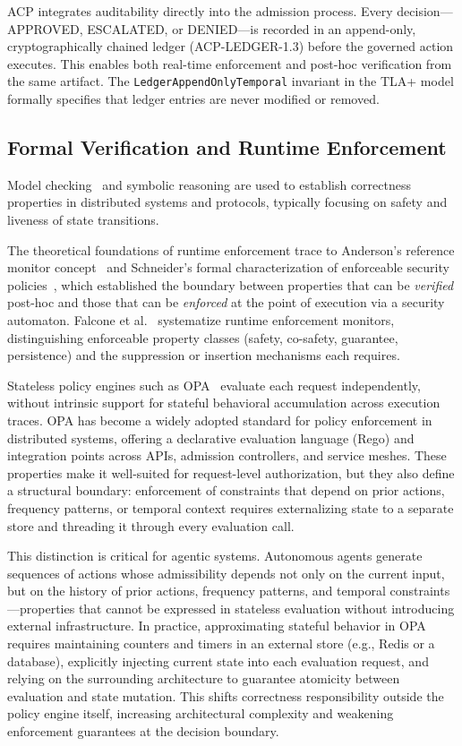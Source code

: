 \documentclass[11pt]{article}
\theoremstyle{definition}
\begin{document}
ACP integrates auditability directly into the admission process.
Every decision---APPROVED, ESCALATED, or DENIED---is recorded in an append-only, cryptographically
chained ledger (ACP-LEDGER-1.3) before the governed action executes.
This enables both real-time enforcement and post-hoc verification from the same artifact.
The \texttt{LedgerAppendOnlyTemporal} invariant in the TLA+ model formally specifies
that ledger entries are never modified or removed.

\subsection{Formal Verification and Runtime Enforcement}
\label{sec:related-formal}

Model checking~\cite{lamport2002specifying} and symbolic reasoning are used to establish
correctness properties in distributed systems and protocols, typically focusing on safety
and liveness of state transitions.

The theoretical foundations of runtime enforcement trace to Anderson's reference monitor
concept~\cite{anderson1972planning} and Schneider's formal characterization of enforceable
security policies~\cite{schneider2000enforceable}, which established the boundary between
properties that can be \emph{verified} post-hoc and those that can be \emph{enforced}
at the point of execution via a security automaton.
Falcone et al.~\cite{falcone2012runtime} systematize runtime enforcement monitors,
distinguishing enforceable property classes (safety, co-safety, guarantee, persistence)
and the suppression or insertion mechanisms each requires.

Stateless policy engines such as OPA~\cite{opa} evaluate each request independently,
without intrinsic support for stateful behavioral accumulation across execution traces.
OPA has become a widely adopted standard for policy enforcement in distributed systems,
offering a declarative evaluation language (Rego) and integration points across APIs,
admission controllers, and service meshes.
These properties make it well-suited for request-level authorization, but they also define
a structural boundary: enforcement of constraints that depend on prior actions, frequency
patterns, or temporal context requires externalizing state to a separate store and threading
it through every evaluation call.

This distinction is critical for agentic systems.
Autonomous agents generate sequences of actions whose admissibility depends not only on
the current input, but on the history of prior actions, frequency patterns, and temporal
constraints---properties that cannot be expressed in stateless evaluation without introducing
external infrastructure.
In practice, approximating stateful behavior in OPA requires maintaining counters and timers
in an external store (e.g., Redis or a database), explicitly injecting current state into
each evaluation request, and relying on the surrounding architecture to guarantee atomicity
between evaluation and state mutation.
This shifts correctness responsibility outside the policy engine itself, increasing
architectural complexity and weakening enforcement guarantees at the decision boundary.
\end{document}
